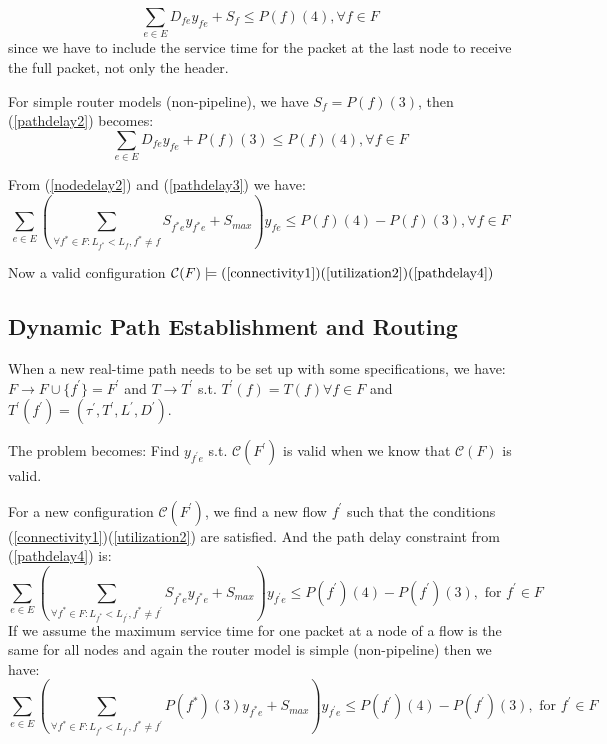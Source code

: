\documentclass[10pt]{article}
\begin{document}
\begin{equation}\label{pathdelay2}
\sum_{e \in E}D_{fe}y_{fe} + S_f \leq P(f)(4), \forall f \in F
\end{equation}
since we have to include the service time for the packet at the last node to 
receive the full packet, not only the header.

For simple router models (non-pipeline), we have $S_f = P(f)(3)$, then (\ref{pathdelay2})
becomes:
\begin{equation}\label{pathdelay3}
\sum_{e \in E}D_{fe}y_{fe} + P(f)(3) \leq P(f)(4), \forall f \in F
\end{equation}

From (\ref{nodedelay2}) and (\ref{pathdelay3}) we have:
\begin{equation}\label{pathdelay4}
\sum_{e \in E} (\sum_{\forall f^{*} \in F:L_{f^{*}} < L_{f}, f^{*} \neq f}S_{f^{*}e}y_{f^{*}e}+S_{max})y_{fe} 
\leq P(f)(4)-P(f)(3), \forall f \in F
\end{equation}

Now a valid configuration $\mathcal{C}(F) \models (\ref{connectivity1}) 
(\ref{utilization2}) (\ref{pathdelay4})$

\subsection{Dynamic Path Establishment and Routing}
When a new real-time path needs to be set up with some specifications, we have:
$F \rightarrow F \cup \{f^{'} \}=F^{'}$
and $T \rightarrow T^{'}$ s.t. $T^{'} (f)=T(f)\forall f \in F$ and $T^{'} (f^{'} )=(\tau ^{'}, T^{'}, L^{'}, D^{'})$.

The problem becomes: Find $y_{f^{'}e}$ s.t. $\mathcal{C}(F^{'})$ is valid
when we know that $\mathcal{C}(F)$ is valid.

For a new configuration $\mathcal{C}(F^{'})$, we find a new flow $f^{'}$ such that
the conditions (\ref{connectivity1})(\ref{utilization2}) are satisfied. And the path delay
constraint from (\ref{pathdelay4}) is:
\begin{equation}\label{pathdelay5}
\sum_{e \in E} (\sum_{\forall f^{*} \in F:L_{f^{*}} < L_{f^{'}}, f^{*} \neq f^{'}}S_{f^{*}e}y_{f^{*}e}+S_{max})y_{f^{'}e} 
\leq P(f^{'})(4)-P(f^{'})(3), \mbox{ for } f^{'} \in F
\end{equation}
If we assume the maximum service time for one packet at a node of a flow is the same
for all nodes and again the router model is simple (non-pipeline) then we have:
\begin{equation}\label{pathdelay5}
\sum_{e \in E} (\sum_{\forall f^{*} \in F:L_{f^{*}} < L_{f^{'}}, f^{*} \neq f^{'}}P(f^{*})(3)y_{f^{*}e}+S_{max})y_{f^{'}e} 
\leq P(f^{'})(4)-P(f^{'})(3), \mbox{ for } f^{'} \in F
\end{equation}
\end{document}
